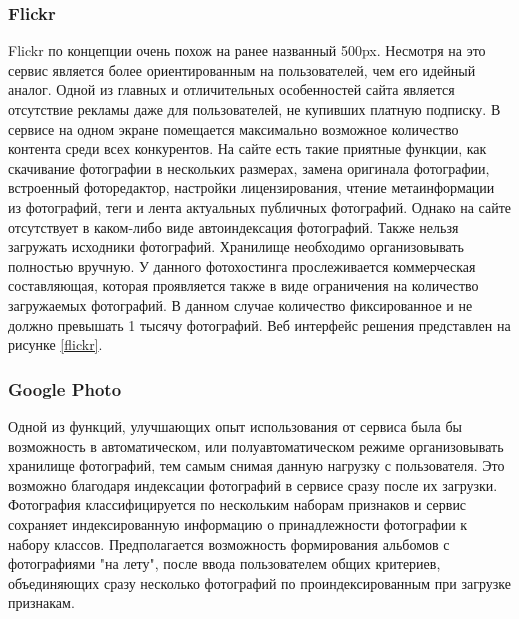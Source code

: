 
\subsubsection{Flickr}
Flickr по концепции очень похож на ранее названный 500px.
Несмотря на это сервис является более ориентированным на пользователей, чем его идейный аналог.
Одной из главных и отличительных особенностей сайта является отсутствие рекламы даже для пользователей, не купивших платную подписку. 
В сервисе на одном экране помещается максимально возможное количество контента среди всех конкурентов.
На сайте есть такие приятные функции, как скачивание фотографии в нескольких размерах, замена оригинала фотографии, встроенный фоторедактор, настройки лицензирования, чтение метаинформации из фотографий, теги и лента актуальных публичных фотографий.
Однако на сайте отсутствует в каком-либо виде автоиндексация фотографий.
Также нельзя загружать исходники фотографий.
Хранилище необходимо организовывать полностью вручную.
У данного фотохостинга прослеживается коммерческая составляющая, которая проявляется также в виде ограничения на количество загружаемых фотографий.
В данном случае количество фиксированное и не должно превышать 1 тысячу фотографий.
Веб интерфейс решения представлен на рисунке \ref{flickr}.


\subsubsection{Google Photo}

Одной из функций, улучшающих опыт использования от сервиса была бы возможность в автоматическом, или полуавтоматическом режиме организовывать хранилище фотографий, тем самым снимая данную нагрузку с пользователя.
Это возможно благодаря индексации фотографий в сервисе сразу после их загрузки. 
Фотография классифицируется по нескольким наборам признаков и сервис сохраняет индексированную информацию о принадлежности фотографии к набору классов.
Предполагается возможность формирования альбомов с фотографиями "на лету", после ввода пользователем общих критериев, объединяющих сразу несколько фотографий по проиндексированным при загрузке признакам.

